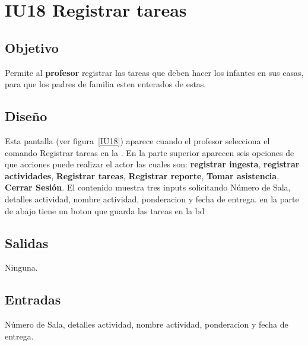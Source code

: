 \newpage
\section{IU18 Registrar tareas}

\subsection{Objetivo}
	Permite al {\bf profesor} registrar las tareas que deben hacer los infantes en sus casas, para que los padres de familia esten enterados de estas.

\subsection{Diseño}
	 Esta pantalla  (ver figura~\ref{IU18}) aparece cuando el            profesor selecciona el comando Registrar tareas en la . 
         En la parte superior aparecen seis opciones de que acciones puede realizar el actor las cuales son: {\bf registrar ingesta}, {\bf registrar actividades}, {\bf Registrar tareas}, {\bf Registrar reporte}, {\bf Tomar asistencia}, {\bf Cerrar Sesión}. 
         El contenido muestra tres inputs solicitando Número de Sala, detalles actividad, nombre actividad, ponderacion y fecha de entrega.
         en la parte de abajo tiene un boton que guarda las tareas en la bd
        
 

\subsection{Salidas}

	Ninguna.

\subsection{Entradas}
Número de Sala, detalles actividad, nombre actividad, ponderacion y fecha de entrega.

